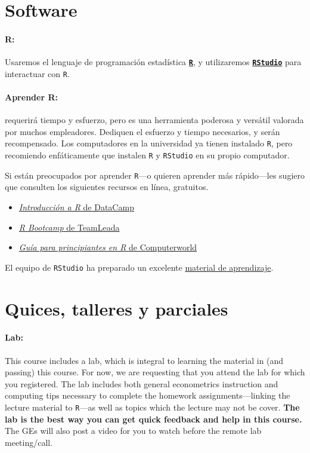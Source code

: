 \documentclass[10pt]{article}
\begin{document}
\section*{Software}

\paragraph{R:} Usaremos el lenguaje de programación estadística \href{https://www.r-project.org/}{\textbf{\texttt{R}}}, y utilizaremos \href{https://www.rstudio.com}{\textbf{\texttt{RStudio}}} para interactuar con \texttt{R}.

\paragraph{Aprender R:} requerirá tiempo y esfuerzo, pero es una herramienta poderosa y versátil valorada por muchos empleadores. Dediquen el esfuerzo y tiempo necesarios, y serán recompensado. Los computadores en la universidad ya tienen instalado \texttt{R}, pero recomiendo enfáticamente que instalen \texttt{R} y \texttt{RStudio} en su propio computador.

Si están preocupados por aprender \texttt{R}---o quieren aprender más rápido---les sugiero que consulten los siguientes recursos en línea, gratuitos.
\begin{itemize}
	\item \href{https://www.datacamp.com/courses/free-introduction-to-r}{\textit{Introducción a R} de DataCamp}
	\item \href{https://www.teamleada.com/courses/r-bootcamp}{\textit{R Bootcamp} de TeamLeada}
	\item \href{https://www.computerworld.com/article/2497143/business-intelligence-beginner-s-guide-to-r-introduction.html}{\textit{Guía para principiantes en R} de Computerworld}
\end{itemize}
El equipo de \texttt{RStudio} ha preparado un excelente \href{https://education.rstudio.com/learn/beginner/}{material de aprendizaje}.


\section*{Quices, talleres y parciales}

\paragraph{Lab:} This course includes a lab, which is integral to learning the material in (and passing) this course. For now, we are requesting that you attend the lab for which you registered. The lab includes both general econometrics instruction and computing tips necessary to complete the homework assignments---linking the lecture material to \texttt{R}---as well as topics which the lecture may not be cover. \textbf{The lab is the best way you can get quick feedback and help in this course.} The GEs will also post a video for you to watch before the remote lab meeting/call.
\end{document}
